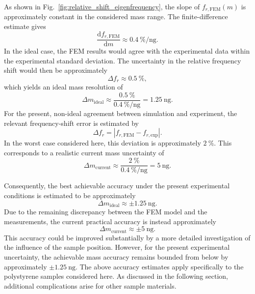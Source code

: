 As shown in Fig.~\ref{fig:relative_shift_eigenfrequency}, the slope of \(f_{r,\mathrm{FEM}}(m)\) is approximately constant in the considered mass range. The finite-difference estimate gives
\begin{equation*}
    \frac{\mathrm d f_{r,\mathrm{FEM}}}{\mathrm d m}
    \approx
    \SI{0.4}{\percent\per\nano\gram}.
\end{equation*}
In the ideal case, the FEM results would agree with the experimental data within the experimental standard deviation. The uncertainty in the relative frequency shift would then be approximately
\begin{equation*}
    \Delta f_r \approx \SI{0.5}{\percent},
\end{equation*}
which yields an ideal mass resolution of
\begin{equation*}
    \Delta m_{\mathrm{ideal}}
    \approx
    \frac{\SI{0.5}{\percent}}
         {\SI{0.4}{\percent\per\nano\gram}}
    =
    \SI{1.25}{\nano\gram}.
\end{equation*}
For the present, non-ideal agreement between simulation and experiment, the relevant frequency-shift error is estimated by
\begin{equation*}
    \Delta f_r
    =
    \left|
    f_{r,\mathrm{FEM}} - f_{r,\mathrm{exp}}
    \right| .
\end{equation*}
In the worst case considered here, this deviation is approximately \(\SI{2}{\percent}\). This corresponds to a realistic current mass uncertainty of
\begin{equation*}
    \Delta m_{\mathrm{current}}
    \approx
    \frac{\SI{2}{\percent}}
         {\SI{0.4}{\percent\per\nano\gram}}
    =
    \SI{5}{\nano\gram}.
\end{equation*}

Consequently, the best achievable accuracy under the present experimental conditions is estimated to be approximately
\begin{equation*}
    \Delta m_{\mathrm{ideal}} \approx \pm \SI{1.25}{\nano\gram}.
\end{equation*}
Due to the remaining discrepancy between the FEM model and the measurements, the current practical accuracy is instead approximately
\begin{equation*}
    \Delta m_{\mathrm{current}} \approx \pm \SI{5}{\nano\gram}.
\end{equation*}
This accuracy could be improved substantially by a more detailed investigation of the influence of the sample position. However, for the present experimental uncertainty, the achievable mass accuracy remains bounded from below by approximately \(\pm \SI{1.25}{\nano\gram}\). The above accuracy estimates apply specifically to the polystyrene samples considered here. As discussed in the following section, additional complications arise for other sample materials.











